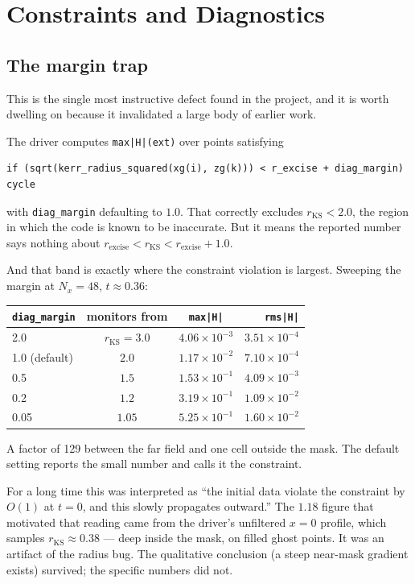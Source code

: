 \documentclass[11pt,openany]{book}
\begin{document}
\chapter{Constraints and Diagnostics}
\label{ch:diag}

\section{The margin trap}

This is the single most instructive defect found in the project, and it is
worth dwelling on because it invalidated a large body of earlier work.

The driver computes \texttt{max|H|(ext)} over points satisfying
\begin{lstlisting}
if (sqrt(kerr_radius_squared(xg(i), zg(k))) < r_excise + diag_margin) cycle
\end{lstlisting}
with \texttt{diag\_margin} defaulting to $1.0$. That correctly excludes
$r_{\mathrm{KS}} < 2.0$, the region in which the code is known to be
inaccurate. But it means the reported number says nothing about
$r_{\mathrm{excise}} < r_{\mathrm{KS}} < r_{\mathrm{excise}} + 1.0$.

And that band is exactly where the constraint violation is largest. Sweeping
the margin at $N_x = 48$, $t \approx 0.36$:

\begin{center}
\begin{tabular}{@{}lccr@{}}
\toprule
\texttt{diag\_margin} & monitors from & \texttt{max|H|} & \texttt{rms|H|} \\
\midrule
2.0 & $r_{\mathrm{KS}} = 3.0$ & $4.06\times10^{-3}$ & $3.51\times10^{-4}$ \\
1.0 (default) & $2.0$ & $1.17\times10^{-2}$ & $7.10\times10^{-4}$ \\
0.5 & $1.5$ & $1.53\times10^{-1}$ & $4.09\times10^{-3}$ \\
0.2 & $1.2$ & $3.19\times10^{-1}$ & $1.09\times10^{-2}$ \\
0.05 & $1.05$ & $5.25\times10^{-1}$ & $1.60\times10^{-2}$ \\
\bottomrule
\end{tabular}
\end{center}

A factor of 129 between the far field and one cell outside the mask. The
default setting reports the small number and calls it the constraint.

\gotcha
For a long time this was interpreted as ``the initial data violate the
constraint by $O(1)$ at $t=0$, and this slowly propagates outward.'' The
$1.18$ figure that motivated that reading came from the driver's unfiltered
$x = 0$ profile, which samples $r_{\mathrm{KS}} \approx 0.38$ --- deep inside
the mask, on filled ghost points. It was an artifact of the radius bug. The
qualitative conclusion (a steep near-mask gradient exists) survived; the
specific numbers did not.
\end{document}
